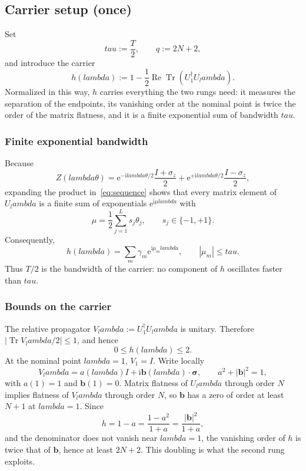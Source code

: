 \documentclass[%
  aps,
  pra,
  preprint,
  superscriptaddress,
  amsmath,amssymb,
  nofootinbib,
  floatfix,
]{revtex4-2}
\def\lambda{lambda}\def\tau{tau}\def\phi{phi}\def\alpha{alpha}%
\theoremstyle{definition}
\theoremstyle{remark}
\newcommand{\Tr}{\operatorname{Tr}}
\newcommand{\Ree}{\operatorname{Re}}
\newcommand{\tauvar}{\tau}
\begin{document}
\subsection{Carrier setup (once)}
\label{sec:carrier}

Set
\begin{equation}
\tauvar:=\frac{T}{2},
\qquad q:=2N+2,
\label{eq:tauq}
\end{equation}
and introduce the carrier
\begin{equation}
h(\lambda):=
1-\frac12\Ree\Tr\!(U_1^\dagger U_\lambda).
\label{eq:h}
\end{equation}
Normalized in this way, $h$ carries everything the two rungs need: it measures the separation
of the endpoints, its vanishing order at the nominal point is twice the order of the matrix
flatness, and it is a finite exponential sum of bandwidth $\tauvar$.

\subsubsection{Finite exponential bandwidth}

Because
\[
Z(\lambda\theta)
=\mathrm{e}^{-\mathrm{i}\lambda\theta/2}\frac{I+\sigma_z}{2}
 +\mathrm{e}^{+\mathrm{i}\lambda\theta/2}\frac{I-\sigma_z}{2},
\]
expanding the product in~\eqref{eq:sequence} shows that every matrix element of $U_\lambda$ is a
finite sum of exponentials $\mathrm{e}^{\mathrm{i}\mu\lambda}$ with
\begin{equation}
\mu=\frac12\sum_{j=1}^L s_j\theta_j,
\qquad s_j\in\{-1,+1\}.
\end{equation}
Consequently,
\begin{equation}
h(\lambda)=\sum_m \gamma_m \mathrm{e}^{\mathrm{i}\mu_m\lambda},
\qquad |\mu_m|\le\tauvar.
\label{eq:expsum}
\end{equation}
Thus $T/2$ is the bandwidth of the carrier: no component of $h$ oscillates faster than
$\tauvar$.

\subsubsection{Bounds on the carrier}

The relative propagator $V_\lambda:=U_1^\dagger U_\lambda$ is unitary. Therefore
$|\Tr V_\lambda/2|\le1$, and hence
\begin{equation}
0\le h(\lambda)\le2.
\label{eq:h-bounds}
\end{equation}
At the nominal point $\lambda=1$, $V_1=I$. Write locally
\[
V_\lambda=a(\lambda)I+\mathrm{i}\bm b(\lambda)\cdot\bm\sigma,
\qquad a^2+|\bm b|^2=1,
\]
with $a(1)=1$ and $\bm b(1)=0$. Matrix flatness of $U_\lambda$ through order $N$ implies
flatness of $V_\lambda$ through order $N$, so $\bm b$ has a zero of order at least $N+1$ at
$\lambda=1$. Since
\[
h=1-a=\frac{1-a^2}{1+a}
=\frac{|\bm b|^2}{1+a},
\]
and the denominator does not vanish near $\lambda=1$, the vanishing order of $h$ is twice that
of $\bm b$, hence at least $2N+2$. This doubling is what the second rung exploits.
\end{document}
